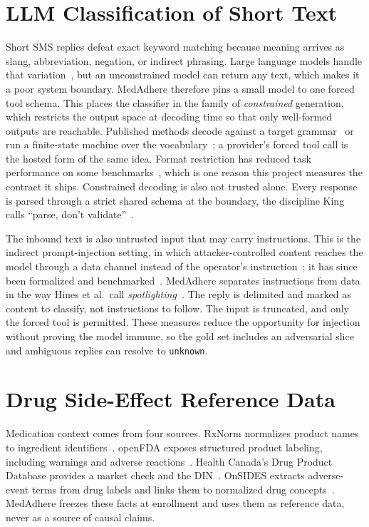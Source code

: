 \section{LLM Classification of Short Text}

Short SMS replies defeat exact keyword matching because meaning arrives as
slang, abbreviation, negation, or indirect phrasing. Large language models
handle that variation~\cite{singhal2023clinical}, but an unconstrained model
can return any text, which makes it a poor system boundary. MedAdhere therefore
pins a small model to one forced tool schema. This places the classifier in the
family of \emph{constrained} generation, which restricts the output space at
decoding time so that only well-formed outputs are reachable. Published methods
decode against a target grammar~\cite{scholak2021picard,geng2023grammar} or run
a finite-state machine over the vocabulary~\cite{willard2023guided}; a
provider's forced tool call is the hosted form of the same idea. Format
restriction has reduced task performance on some
benchmarks~\cite{tam2024format}, which is one reason this project measures the
contract it ships. Constrained decoding is also not trusted alone. Every
response is parsed through a strict shared schema at the boundary, the
discipline King calls ``parse, don't validate''~\cite{king2019parse}.

The inbound text is also untrusted input that may carry instructions. This is
the indirect prompt-injection setting, in which attacker-controlled content
reaches the model through a data channel instead of the operator's
instruction~\cite{abdelnabi2023indirect}; it has since been formalized and
benchmarked~\cite{liu2024promptinjection}. MedAdhere separates instructions
from data in the way Hines et al.\ call
\emph{spotlighting}~\cite{hines2024spotlighting}. The reply is delimited and
marked as content to classify, not instructions to follow. The input is
truncated, and only the forced tool is permitted. These measures reduce the
opportunity for injection without proving the model immune, so the gold set
includes an adversarial slice and ambiguous replies can resolve to
\texttt{unknown}.

\section{Drug Side-Effect Reference Data}

Medication context comes from four sources. RxNorm normalizes product names to
ingredient identifiers~\cite{rxnorm}. openFDA exposes structured product
labeling, including warnings and adverse reactions~\cite{openfda}. Health
Canada's Drug Product Database provides a market check and the
DIN~\cite{dpd}. OnSIDES extracts adverse-event terms from drug labels and links
them to normalized drug concepts~\cite{tanaka2025onsides}. MedAdhere freezes
these facts at enrollment and uses them as reference data, never as a source of
causal claims.

